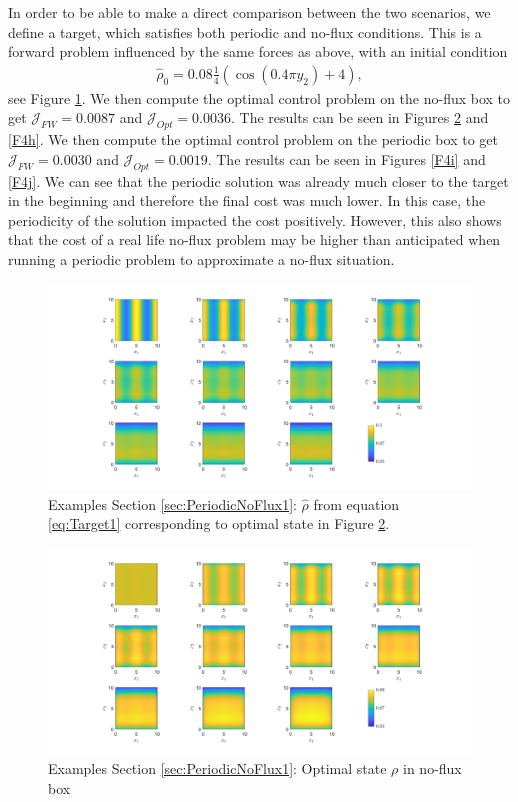 \documentclass[11pt, a4paper]{article}
\theoremstyle{definition}
\newcommand{\hr}{\widehat \rho}
\begin{document}
In order to be able to make a direct comparison between the two scenarios, we define a target, which satisfies both periodic and no-flux conditions. This is a forward problem influenced by the same forces as above, with an initial condition
\begin{align}\label{eq:Target1}
	\hr_0 = 0.08\frac{1}{4}(\cos(0.4\pi y_2) + 4),
\end{align}
see Figure \ref{F4f}.
We then compute the optimal control problem on the no-flux box to get $\mathcal J_{FW} = 0.0087$ and $\mathcal J_{Opt} = 0.0036$. The results can be seen in Figures \ref{F4g} and \ref{F4h}.
We then compute the optimal control problem on the periodic box to get $\mathcal J_{FW} = 0.0030$ and $\mathcal J_{Opt} = 0.0019$. The results can be seen in Figures \ref{F4i} and \ref{F4j}. We can see that the periodic solution was already much closer to the target in the beginning and therefore the final cost was much lower. In this case, the periodicity of the solution impacted the cost positively. However, this also shows that the cost of a real life no-flux problem may be higher than anticipated when running a periodic problem to approximate a no-flux situation.
\begin{figure}[h]
	\centering
	\includegraphics[scale=0.35]{rhoHatPeri3.png}
	\caption{Examples Section \ref{sec:PeriodicNoFlux1}: $\hr$ from equation \ref{eq:Target1} corresponding to optimal state in Figure \ref{F4g}.} 
	\label{F4f}
\end{figure}
\begin{figure}[h]
	\centering
	\includegraphics[scale=0.35]{rhoOptPeri3.png}
	\caption{Examples Section \ref{sec:PeriodicNoFlux1}: Optimal state $\rho$ in no-flux box} 
	\label{F4g}
\end{figure}
\end{document}
